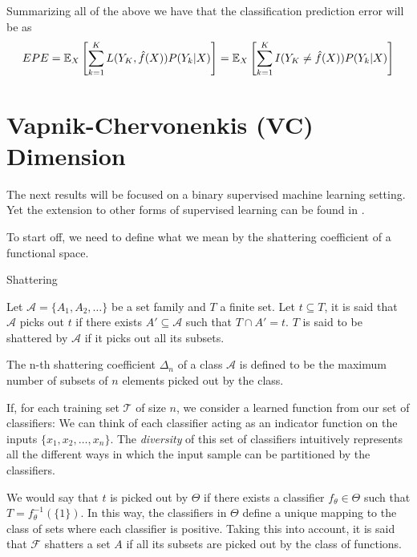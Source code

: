 \begin{appendices}

Summarizing all of the above we have that the classification prediction error will be as
\begin{equation}
EPE = \operatorname{\mathbb{E}}_X\left[ \sum_{k=1}^{K} L( Y_K , \hat{f}(X) ) P(Y_k|X) \right] =
\operatorname{\mathbb{E}}_X\left[ \sum_{k=1}^{K} I(Y _K\neq \hat{f}(X)) P(Y_k|X) \right]
\end{equation}\label{eq:classificationEPE}


\section{Vapnik-Chervonenkis (VC) Dimension }\label{appx:sec:vcDimension}

The next results will be focused on a binary supervised machine learning setting.
Yet the extension to other forms of supervised learning can be found in \textcite{cherkassky-learning2007}.


To start off, we need to define what we mean by the shattering coefficient of a functional space.

\begin{definition}{Shattering}

Let $\mathcal {A}= \{A_1,A_{2},\dots \}$ be a set family and $T$ a finite set.
Let $t \subseteq T$, it is said that $\mathcal {A}$ picks out $t$ if there exists $A' \subseteq \mathcal {A} $ such that $ T \cap A' = t$.
$T$ is said to be shattered by $\mathcal {A}$ if it picks out all its subsets.


\end{definition}

The n-th shattering coefficient $\Delta_n$ of a class $\mathcal {A}$ is defined to be the maximum number of subsets of $n$ elements picked out by the class.

If, for each training set $\mathcal {T}$ of size $n$, we consider a learned function from our set of classifiers:
We can think of each classifier acting as an indicator function on the inputs $\{ x_1,x_2,\ldots,x_n \}$.
The \textit{diversity} of this set of classifiers intuitively represents all the different ways in which the input sample can be partitioned by the classifiers.

We would say that $t$ is picked out by $\Theta$ if there exists a classifier $f_{\theta} \in \Theta$ such that $T = f_{\theta}^{-1}(\{1\})$.
In this way, the classifiers in $\Theta$ define a unique mapping to the class of sets where each classifier is positive.
Taking this into account, it is said that $\mathcal {F}$ shatters a set $A$ if all its subsets are picked out by the class of functions.


\end{appendices}
